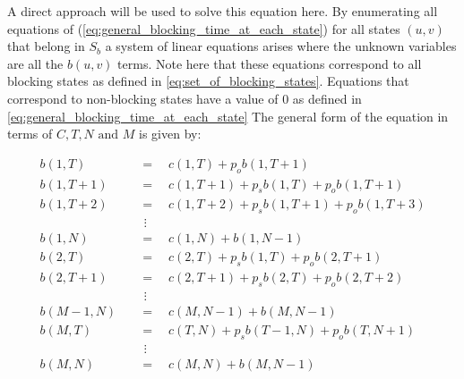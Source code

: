 A direct approach will be used to solve this equation here. 
By enumerating all equations of (\ref{eq:general_blocking_time_at_each_state}) 
for all states \((u,v)\) that belong in \(S_b\) 
a system of linear equations arises where the unknown variables are all the 
\(b(u,v)\) terms. 
Note here that these equations correspond to all blocking states as defined in
\ref{eq:set_of_blocking_states}. 
Equations that correspond to non-blocking states have a value of \(0\) as 
defined in \ref{eq:general_blocking_time_at_each_state}
The general form of the equation in terms of \(C,T,N \text{ and } M\) is given by: 

\begin{align}
    b(1,T) \quad &= \quad c(1, T) + p_o b(1, T + 1) \label{eq:first_eq_of_blocking_general}\\
    b(1,T + 1) \quad &= \quad c(1, T + 1) + p_s b(1, T) + p_o b(1, T + 1) \\
    b(1,T + 2) \quad &= \quad c(1, T + 2) + p_s b(1, T + 1) + p_o b(1, T + 3) \\
    & \ \, \vdots \nonumber \\
    b(1, N) \quad &= \quad c(1, N) + b(1, N - 1) \\
    b(2, T) \quad &= \quad c(2, T) + p_s b(1, T) + p_o b(2, T + 1) \\
    b(2, T + 1) \quad &= \quad c(2, T + 1) + p_s b(2, T) + p_o b(2, T + 2) \\
    & \ \, \vdots \nonumber \\
    b(M - 1, N) \quad &= \quad c(M, N - 1) + b(M, N-1) \\ 
    b(M, T) \quad &= \quad c(T, N) + p_s b(T-1, N) + p_o b(T, N+1) \\
    & \ \, \vdots \nonumber \\
    b(M, N) \quad &= \quad c(M, N) + b(M, N-1) \label{eq:last_eq_of_blocking_general}
\end{align}

